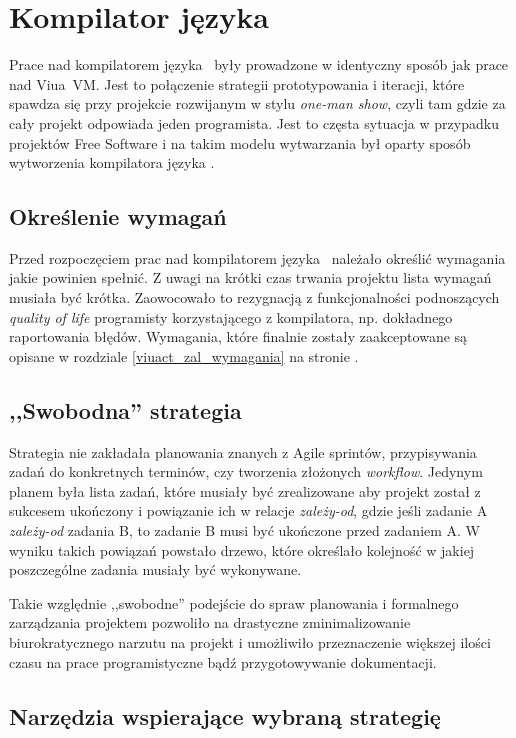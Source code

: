 \section{Kompilator języka \ViuAct}

Prace nad kompilatorem języka \ViuAct\ były prowadzone w identyczny sposób jak
prace nad Viua~VM. Jest to połączenie strategii prototypowania i iteracji, które
spawdza się przy projekcie rozwijanym w stylu \emph{one-man show}, czyli tam
gdzie za cały projekt odpowiada jeden programista. Jest to częsta sytuacja w
przypadku projektów Free Software i na takim modelu wytwarzania był oparty
sposób wytworzenia kompilatora języka \ViuAct.

\subsection{Określenie wymagań}

Przed rozpoczęciem prac nad kompilatorem języka \ViuAct\ należało określić
wymagania jakie powinien spełnić. Z uwagi na krótki czas trwania projektu lista
wymagań musiała być krótka. Zaowocowało to rezygnacją z funkcjonalności
podnoszących \emph{quality of life} programisty korzystającego z
kompilatora, np. dokładnego raportowania błędów. Wymagania, które finalnie
zostały zaakceptowane są opisane w rozdziale \ref{viuact_zal_wymagania} na
stronie \pageref{viuact_zal_wymagania}.

\subsection{,,Swobodna'' strategia}

Strategia nie zakładała planowania znanych z Agile sprintów, przypisywania zadań
do konkretnych terminów, czy tworzenia złożonych \emph{workflow}. Jedynym planem
była lista zadań, które musiały być zrealizowane aby projekt został z sukcesem
ukończony i powiązanie ich w relacje \emph{zależy-od}, gdzie jeśli zadanie A
\emph{zależy-od} zadania B, to zadanie B musi być ukończone przed zadaniem A.
W wyniku takich powiązań powstało drzewo, które określało kolejność w jakiej
poszczególne zadania musiały być wykonywane.

Takie względnie ,,swobodne'' podejście do spraw planowania i formalnego
zarządzania projektem pozwoliło na drastyczne zminimalizowanie biurokratycznego
narzutu na projekt i umożliwiło przeznaczenie większej ilości czasu na prace
programistyczne bądź przygotowywanie dokumentacji.

\subsection{Narzędzia wspierające wybraną strategię}

